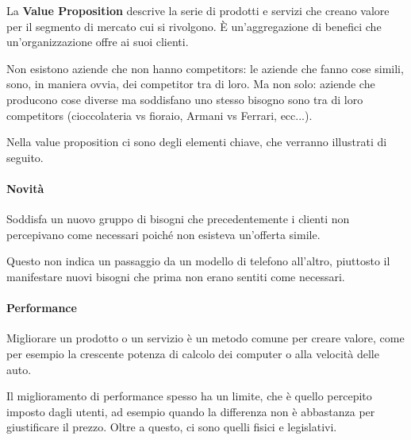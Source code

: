 \begin{definition}
La \textbf{Value Proposition} descrive la serie di prodotti e servizi che
creano valore per il segmento di mercato cui si rivolgono. È un'aggregazione di
benefici che un'organizzazione offre ai suoi clienti.
\end{definition}

Non esistono aziende che non hanno competitors: le aziende che fanno cose
simili, sono, in maniera ovvia, dei competitor tra di loro. Ma non solo:
aziende che producono cose diverse ma soddisfano uno stesso bisogno sono tra di
loro competitors (cioccolateria vs fioraio, Armani vs Ferrari, ecc...).

Nella value proposition ci sono degli elementi chiave, che verranno illustrati
di seguito.

\paragraph*{Novità} Soddisfa un nuovo gruppo di bisogni che precedentemente i
clienti non percepivano come necessari poiché non esisteva un'offerta simile.

Questo non indica un passaggio da un modello di telefono all'altro, piuttosto
il manifestare nuovi bisogni che prima non erano sentiti come necessari.

\paragraph*{Performance} Migliorare un prodotto o un servizio è un metodo
comune per creare valore, come per esempio la crescente potenza di calcolo dei
computer o alla velocità delle auto.

Il miglioramento di performance spesso ha un limite, che è quello percepito
imposto dagli utenti, ad esempio quando la differenza non è abbastanza per
giustificare il prezzo. Oltre a questo, ci sono quelli fisici e legislativi.
